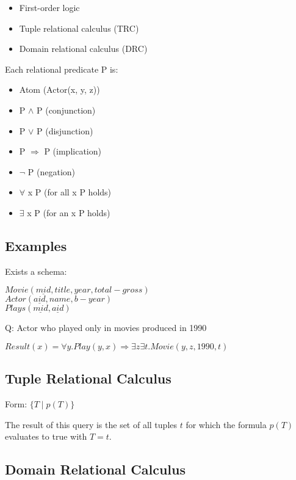 \documentclass[12pt,a4paper]{article}
\begin{document}
\begin{itemize}
    \item First-order logic
    \item Tuple relational calculus (TRC)
    \item Domain relational calculus (DRC)
\end{itemize}

Each relational predicate P is:

\begin{itemize}
    \item Atom (Actor(x, y, z))
    \item P $\land$ P (conjunction)
    \item P $\lor$ P (disjunction)
    \item P $\Rightarrow$ P (implication)
    \item $\lnot$ P (negation)
    \item $\forall$ x P (for all x P holds)
    \item $\exists$ x P (for an x P holds)
\end{itemize}

\subsection*{Examples}

Exists a schema:

$Movie(\underline{mid},title,year,total-gross)$ \\
$Actor(\underline{aid},name,b-year)$ \\
$Plays(\underline{mid},\underline{aid})$

Q: Actor who played only in movies produced in 1990

$Result(x) = \forall{y}.Play(y, x) \Rightarrow \exists{z}\exists{t}.Movie(y, z, 1990,t)$

\subsection*{Tuple Relational Calculus}

Form: $\{T \mid p(T)\}$

The result of this query is the set of all tuples $t$ for which the formula $p(T)$ evaluates to true with $T = t$.

\subsection*{Domain Relational Calculus}
\end{document}
